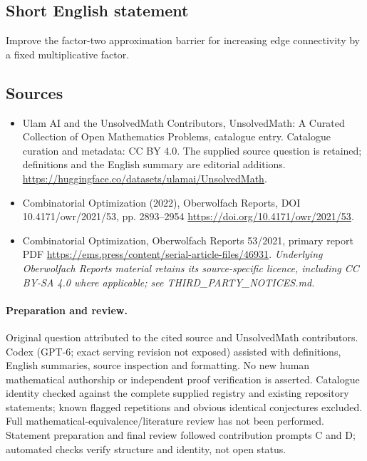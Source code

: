 \documentclass[11pt]{article}
\begin{document}
\subsection{Short English statement}
Improve the factor-two approximation barrier for increasing edge connectivity by a fixed multiplicative factor.
\subsection{Sources}
\begin{itemize}
\item[\hypertarget{source:statement:1}{S1}] Ulam AI and the UnsolvedMath Contributors, UnsolvedMath: A Curated Collection of Open Mathematics Problems, catalogue entry. Catalogue curation and metadata: CC BY 4.0. The supplied source question is retained; definitions and the English summary are editorial additions.
\url{https://huggingface.co/datasets/ulamai/UnsolvedMath}.
\item[\hypertarget{source:statement:2}{S2}] Combinatorial Optimization (2022), Oberwolfach Reports, DOI 10.4171/owr/2021/53, pp. 2893--2954
\url{https://doi.org/10.4171/owr/2021/53}.
\item[\hypertarget{source:statement:3}{S3}] Combinatorial Optimization, Oberwolfach Reports 53/2021, primary report PDF
\url{https://ems.press/content/serial-article-files/46931}.
\textit{Underlying Oberwolfach Reports material retains its source-specific licence, including CC BY-SA 4.0 where applicable; see THIRD\_PARTY\_NOTICES.md.}
\end{itemize}
\paragraph{Preparation and review.}
Original question attributed to the cited source and UnsolvedMath contributors. Codex (GPT-6; exact serving revision not exposed) assisted with definitions, English summaries, source inspection and formatting. No new human mathematical authorship or independent proof verification is asserted. Catalogue identity checked against the complete supplied registry and existing repository statements; known flagged repetitions and obvious identical conjectures excluded. Full mathematical-equivalence/literature review has not been performed. Statement preparation and final review followed contribution prompts C and D; automated checks verify structure and identity, not open status.
\label{end:statement}
\end{document}
